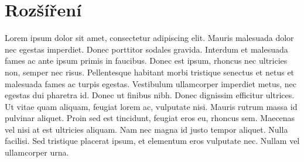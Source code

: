 \documentclass[11pt, a4paper]{article}
\begin{document}
\iffalse
\begin{comment}
\begin{figure}[ht]
\begin{center}
\texttt{[image: etiopan.eps]}\hspace{-0.2em}
\reflectbox{\texttt{[image: etiopan.eps]}}
\caption{Malý Etiopánek a jeho bratříček}
\label{pic:1}
\end{center}
\end{figure}

\newpage
Rozdíl mezi vektorovým\dots
\begin{figure}[ht]
\begin{center}
\texttt{[image: oniisan.eps]}
\caption{Vektorový obrázek}
\label{pic:2}
\end{center}
\end{figure}


\noindent \dots a bitmapovým obrázkem
\begin{figure}[ht]
\begin{center}
\texttt{[image: oniisan2.eps]}
\caption{Bitmapový obrázek}
\label{pic:3}
\end{center}
\end{figure}

\noindent se projeví například při zvětšení.

Odkazy (nejen ty) na obrázky \ref{pic:1}, \ref{pic:2} a \ref{pic:3}, na  
tabulky \ref{tab:1} a \ref{tab:2} a také na algoritmus \ref{algoritmus:1} jsou udělány pomocí~křížových odkazů. Pak je ovšem potřeba zdrojový soubor přeložit dvakrát.


\end{figure}


\end{comment}
\fi

\section{Rozšíření}
Lorem ipsum dolor sit amet, consectetur adipiscing elit. Mauris malesuada dolor nec egestas imperdiet. Donec porttitor sodales gravida. Interdum et malesuada fames ac ante ipsum primis in faucibus. Donec est ipsum, rhoncus nec ultricies non, semper nec risus. Pellentesque habitant morbi tristique senectus et netus et malesuada fames ac turpis egestas. Vestibulum ullamcorper imperdiet metus, nec egestas dui pharetra id. Donec ut finibus nibh. Donec dignissim efficitur ultrices. Ut vitae quam aliquam, feugiat lorem ac, vulputate nisi. Mauris rutrum massa id pulvinar aliquet. Proin sed est tincidunt, feugiat eros eu, rhoncus sem. Maecenas vel nisi at est ultricies aliquam. Nam nec magna id justo tempor aliquet. Nulla facilisi. Sed tristique placerat ipsum, et elementum eros vulputate nec. Nullam vel ullamcorper urna. 
\end{document}
